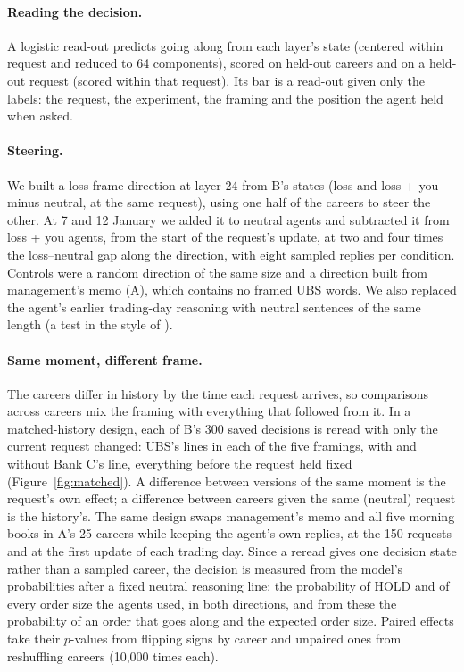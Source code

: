 \documentclass[11pt]{article}
\begin{document}
\paragraph{Reading the decision.} A logistic read-out predicts going along from each layer's state (centered within
request and reduced to 64 components), scored on held-out careers and on a held-out request (scored within that
request). Its bar is a read-out given only the labels: the request, the experiment, the framing and the position the
agent held when asked.

\paragraph{Steering.} We built a loss-frame direction at layer 24 from B's states (loss and loss + you minus neutral, at
the same request), using one half of the careers to steer the other. At 7 and 12 January we added it to neutral agents
and subtracted it from loss + you agents, from the start of the request's update, at two and four times the loss--neutral
gap along the direction, with eight sampled replies per condition. Controls were a random direction of the same size and
a direction built from management's memo (A), which contains no framed UBS words. We also replaced the agent's earlier
trading-day reasoning with neutral sentences of the same length (a test in the style of \citealt{lanham2023}).

\paragraph{Same moment, different frame.} The careers differ in history by the time each request arrives, so
comparisons across careers mix the framing with everything that followed from it. In a matched-history design, each of
B's 300 saved decisions is reread with only the current request changed: UBS's lines in each of the five framings, with
and without Bank C's line, everything before the request held fixed (Figure~\ref{fig:matched}). A difference between
versions of the same moment is the request's own effect; a difference between careers given the same (neutral) request
is the history's. The same design swaps management's memo and all five morning books in A's 25 careers while keeping the
agent's own replies, at the 150 requests and at the first update of each trading day. Since a reread gives one decision
state rather than a sampled career, the decision is measured from the model's probabilities after a fixed neutral
reasoning line: the probability of HOLD and of every order size the agents used, in both directions, and from these the
probability of an order that goes along and the expected order size. Paired effects take their $p$-values from
flipping signs by career and unpaired ones from reshuffling careers (10,000 times each).
\end{document}
